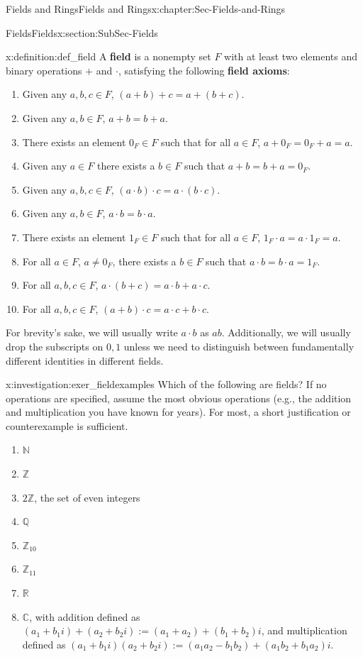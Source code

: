 \documentclass[oneside,10pt,]{book}
\newcommand{\terminology}[1]{\textbf{#1}}
\numberwithin{equation}{section}
\def\C{{\mathbb C}}
\def\Z{{\mathbb Z}}
\def\Q{{\mathbb Q}}
\def\N{{\mathbb N}}
\def\R{{\mathbb R}}
\begin{document}
\begin{chapterptx}{Fields and Rings}{}{Fields and Rings}{}{}{x:chapter:Sec-Fields-and-Rings}
\begin{sectionptx}{Fields}{}{Fields}{}{}{x:section:SubSec-Fields}
\begin{definition}{}{x:definition:def_field}
A \terminology{field} is a nonempty set \(F\) with at least two elements and binary operations \(+\) and \(\cdot\), satisfying the following \terminology{field axioms}:%
\begin{enumerate}
\item{}Given any \(a,b,c\in F\), \((a+b)+c = a+(b+c)\).%
\item{}Given any \(a,b\in F\), \(a+b= b+a\).%
\item{}There exists an element \(0_F\in F\) such that for all \(a\in F\), \(a+0_F = 0_F + a = a\).%
\item{}Given any \(a\in F\) there exists a \(b\in F\) such that \(a+b = b + a =0_F\).%
\item{}Given any \(a,b,c\in F\), \((a\cdot b)\cdot c = a\cdot (b\cdot c)\).%
\item{}Given any \(a,b\in F\), \(a\cdot b = b\cdot a\).%
\item{}There exists an element \(1_F\in F\) such that for all \(a\in F\), \(1_F\cdot a = a\cdot 1_F = a\).%
\item{}For all \(a\in F\), \(a\ne 0_F\), there exists a \(b\in F\) such that \(a\cdot b = b\cdot a = 1_F\).%
\item{}For all \(a,b,c\in F\), \(a\cdot (b+c) = a\cdot b + a\cdot c\).%
\item{}For all \(a,b,c\in F\), \((a+b)\cdot c = a\cdot c + b\cdot c\).%
\end{enumerate}
%
\end{definition}
For brevity's sake, we will usually write \(a\cdot b\) as \(ab\). Additionally, we will usually drop the subscripts on \(0,1\) unless we need to distinguish between fundamentally different identities in different fields.%
\begin{investigation}{}{x:investigation:exer_fieldexamples}%
Which of the following are fields? If no operations are specified, assume the most obvious operations (e.g., the addition and multiplication you have known for years). For most, a short justification or counterexample is sufficient.%
\begin{enumerate}
\item{}\(\N\)%
\item{}\(\Z\)%
\item{}\(2\Z\), the set of even integers%
\item{}\(\Q\)%
\item{}\(\Z_{10}\)%
\item{}\(\Z_{11}\)%
\item{}\(\R\)%
\item{}\(\C\), with addition defined as \((a_1 + b_1 i) + (a_2 + b_2 i) := (a_1 + a_2) + (b_1 + b_2)i\), and multiplication defined as \((a_1 + b_1 i)(a_2 + b_2 i) := (a_1 a_2 - b_1 b_2) + (a_1 b_2 + b_1 a_2) i\).%

\end{enumerate}
\end{investigation}
\end{sectionptx}
\end{chapterptx}
\end{document}
